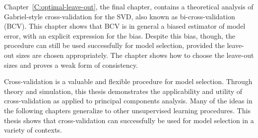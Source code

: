 Chapter~\ref{C:optimal-leave-out}, the final chapter, contains a theoretical analysis of Gabriel-style cross-validation for the SVD, also known as bi-cross-validation (BCV).  This chapter shows that BCV is in general a biased estimator of model error, with an explicit expression for the bias.  Despite this bias, though, the procedure can still be used successfully for model selection, provided the leave-out sizes are chosen appropriately.  The chapter shows how to choose the leave-out sizes and proves a weak form of consistency.

Cross-validation is a valuable and flexible procedure for model selection.  Through theory and simulation, this thesis demonstrates the applicability and utility of cross-validation as applied to principal components analysis.  Many of the ideas in the following chapters generalize to other unsupervised learning procedures.  This thesis shows that cross-validation can successfully be used for model selection in a variety of contexts.
